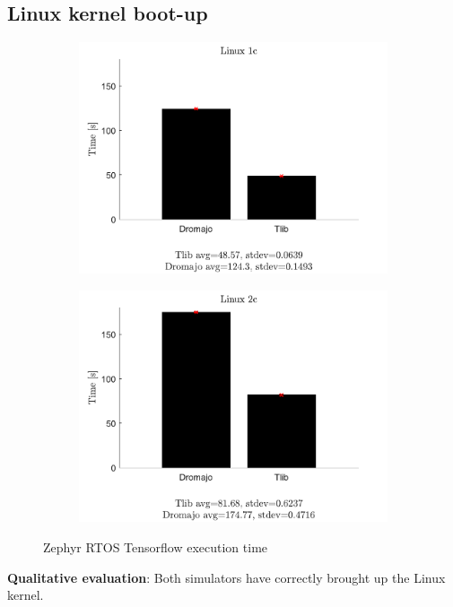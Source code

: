 \subsection{Linux kernel boot-up}

\begin{figure}[h]
    \centering
    \begin{subfigure}{0.5\textwidth}
      \centering
      \includegraphics[width=1.2\linewidth]{figures/benchmarks/Linux1c.pdf}
    \end{subfigure}%
    \begin{subfigure}{0.5\textwidth}
      \centering
      \includegraphics[width=1.2\linewidth]{figures/benchmarks/Linux2c.pdf}
    \end{subfigure}
    \caption{Zephyr RTOS Tensorflow execution time}
\end{figure}
\textbf{Qualitative evaluation}: Both simulators have correctly brought up the Linux kernel.
\vspace*{15px}

